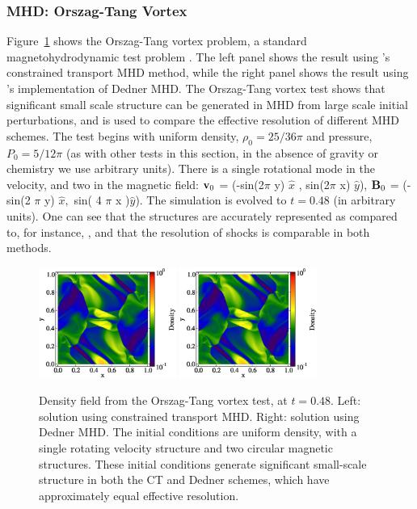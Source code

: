 \subsubsection{MHD: Orszag-Tang Vortex}
\label{sec.tests.mhd}
Figure~\ref{fig.orszag} shows the Orszag-Tang vortex problem, a
standard magnetohydrodynamic test problem \citep{Orszag79}.  The left panel shows
the result using \enzo's constrained transport MHD method, while the right panel shows the result using
\enzo's implementation of Dedner MHD.
The Orszag-Tang vortex test shows that significant small scale structure can be generated in MHD
from large scale initial perturbations, and is used to compare the
effective resolution of different MHD schemes.  The test begins with uniform
density, $\rho_0=25/36 \pi$ and pressure, $P_0=5/12 \pi$ (as with
other tests in this section, in the absence of gravity or chemistry we use
arbitrary units).  There is a
single rotational mode in the velocity, and two in the magnetic field:
${\bf v}_0 $ = (-sin(2$\pi$ y) $ \hat{x}$ , sin(2$\pi$ x) $\hat{y}$),
${\bf B}_0$ = (-sin(2 $\pi$ y) $ \hat{x},$ sin( 4 $\pi$ x )$\hat{y}$).
The simulation is evolved to $t=0.48$ (in arbitrary units).  One can see that the structures
are accurately represented as compared to, for instance,
\citet{Toth00}, and that the resolution of shocks is comparable in
both methods.

\begin{figure}
\begin{center}
\includegraphics[width=0.4\textwidth]{figures/MHDCT_OrszagTang_Density.eps}
\includegraphics[width=0.4\textwidth]{figures/MHDDedner_OrszagTang_Density.eps}
\caption{Density field from the Orszag-Tang vortex test, at $t=0.48$.
Left: solution using constrained transport MHD.  Right: solution using
Dedner MHD. The initial conditions are uniform density, with a single
rotating velocity structure and two circular magnetic structures.
These initial conditions generate significant small-scale structure in
both the CT and Dedner schemes, which have approximately equal
effective resolution.}
\label{fig.orszag}
\end{center}
\end{figure}



